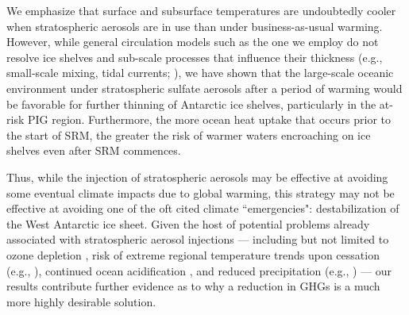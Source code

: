 \documentclass{nature}
\begin{document}
We emphasize that surface and subsurface temperatures are undoubtedly cooler when stratospheric aerosols are in use than under business-as-usual warming. However, while general circulation models such as the one we employ do not resolve ice shelves and sub-scale processes that influence their thickness (e.g., small-scale mixing, tidal currents; \cite{joughin11}), we have shown that the large-scale oceanic environment under stratospheric sulfate aerosols after a period of warming would be favorable for further thinning of Antarctic ice shelves, particularly in the at-risk PIG region. Furthermore, the more ocean heat uptake that occurs prior to the start of SRM, the greater the risk of warmer waters encroaching on ice shelves even after SRM commences.

Thus, while the injection of stratospheric aerosols may be effective at avoiding some eventual climate impacts due to global warming, this strategy may not be effective at avoiding one of the oft cited climate ``emergencies": destabilization of the West Antarctic ice sheet. Given the host of potential problems already associated with stratospheric aerosol injections --- including but not limited to ozone depletion \cite{tilmes08,heckendorn09}, risk of extreme regional temperature trends upon cessation (e.g., \cite{mccusker14}), continued ocean acidification \cite{feely04}, and reduced precipitation (e.g., \cite{bala08}) --- our results contribute further evidence as to why a reduction in GHGs is a much more highly desirable solution. %
\end{document}

